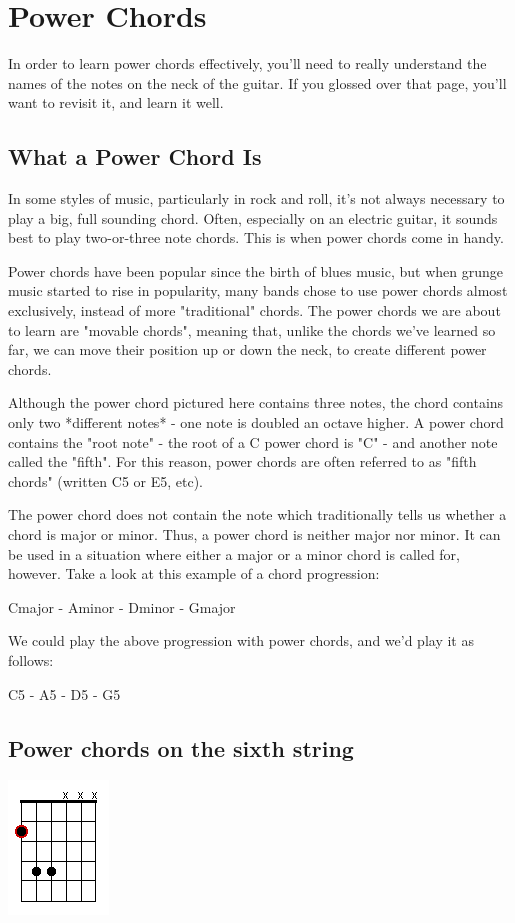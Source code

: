 \section{Power Chords}
In order to learn power chords effectively, you'll need to really understand
the names of the notes on the neck of the guitar. If you glossed over that
page, you'll want to revisit it, and learn it well.

\subsection{What a Power Chord Is}

In some styles of music, particularly in rock and roll, it's not always
necessary to play a big, full sounding chord. Often, especially on an electric
guitar, it sounds best to play two-or-three note chords. This is when power
chords come in handy.

Power chords have been popular since the birth of blues music, but when grunge
music started to rise in popularity, many bands chose to use power chords
almost exclusively, instead of more "traditional" chords. The power chords we
are about to learn are "movable chords", meaning that, unlike the chords we've
learned so far, we can move their position up or down the neck, to create
different power chords.

Although the power chord pictured here contains three notes, the chord contains
only two *different notes* - one note is doubled an octave higher. A power
chord contains the "root note" - the root of a C power chord is "C" - and
another note called the "fifth". For this reason, power chords are often
referred to as "fifth chords" (written C5 or E5, etc).

The power chord does not contain the note which traditionally tells us whether
a chord is major or minor. Thus, a power chord is neither major nor minor. It
can be used in a situation where either a major or a minor chord is called for,
however. Take a look at this example of a chord progression:

Cmajor - Aminor - Dminor - Gmajor

We could play the above progression with power chords, and we'd play it as follows:

C5 - A5 - D5 - G5

\subsection{Power chords on the sixth string}
\includegraphics{partfour/powerchord6.png}

